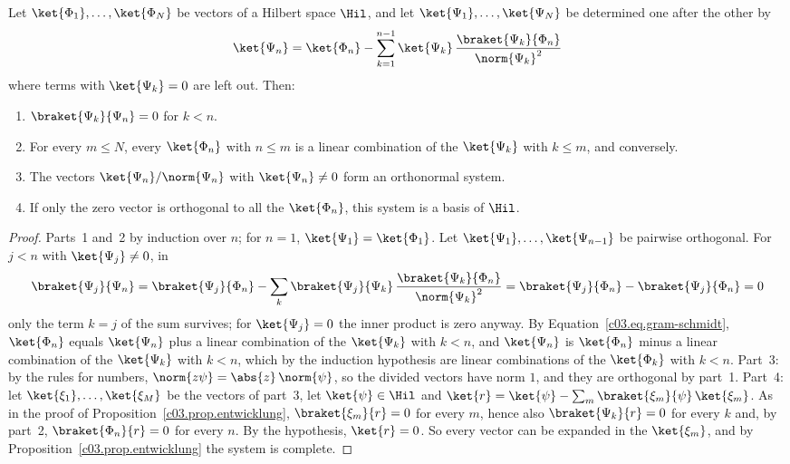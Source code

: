 \begin{proposition}\label{c03.prop.gram-schmidt}
  Let $\ket{\Phi_1}, \dots, \ket{\Phi_N}$ be vectors of a Hilbert space $\Hil$, and let
  $\ket{\Psi_1}, \dots, \ket{\Psi_N}$ be determined one after the other by
  \begin{equation}\label{c03.eq.gram-schmidt}
    \ket{\Psi_n} = \ket{\Phi_n} - \sum_{k=1}^{n-1} \ket{\Psi_k}\, \frac{\braket{\Psi_k}{\Phi_n}}{\norm{\Psi_k}^2}
  \end{equation}
  where terms with $\ket{\Psi_k} = 0$ are left out. Then:
  \begin{enumerate}
    \item $\braket{\Psi_k}{\Psi_n} = 0$ for $k < n$.
    \item For every $m \leq N$, every $\ket{\Phi_n}$ with $n \leq m$ is a linear combination of
      the $\ket{\Psi_k}$ with $k \leq m$, and conversely.
    \item The vectors $\ket{\Psi_n} / \norm{\Psi_n}$ with $\ket{\Psi_n} \neq 0$ form an
      orthonormal system.
    \item If only the zero vector is orthogonal to all the $\ket{\Phi_n}$, this system is a
      basis of $\Hil$.
  \end{enumerate}
\end{proposition}
\begin{proof}
  Parts~1 and~2 by induction over $n$; for $n = 1$, $\ket{\Psi_1} = \ket{\Phi_1}$. Let
  $\ket{\Psi_1}, \dots, \ket{\Psi_{n-1}}$ be pairwise orthogonal. For $j < n$ with
  $\ket{\Psi_j} \neq 0$, in
  \begin{equation}\label{c03.eq.gs-beweis}
    \braket{\Psi_j}{\Psi_n}
    = \braket{\Psi_j}{\Phi_n} - \sum_{k} \braket{\Psi_j}{\Psi_k}\, \frac{\braket{\Psi_k}{\Phi_n}}{\norm{\Psi_k}^2}
    = \braket{\Psi_j}{\Phi_n} - \braket{\Psi_j}{\Phi_n} = 0
  \end{equation}
  only the term $k = j$ of the sum survives; for $\ket{\Psi_j} = 0$ the inner product is zero
  anyway. By Equation~\eqref{c03.eq.gram-schmidt}, $\ket{\Phi_n}$ equals $\ket{\Psi_n}$ plus a
  linear combination of the $\ket{\Psi_k}$ with $k < n$, and $\ket{\Psi_n}$ is $\ket{\Phi_n}$
  minus a linear combination of the $\ket{\Psi_k}$ with $k < n$, which by the induction
  hypothesis are linear combinations of the $\ket{\Phi_k}$ with $k < n$. Part~3: by the rules for
  numbers, $\norm{z\psi} = \abs{z}\, \norm{\psi}$, so the divided vectors have norm $1$, and
  they are orthogonal by part~1. Part~4: let $\ket{\xi_1}, \dots, \ket{\xi_M}$ be the vectors of
  part~3, let $\ket{\psi} \in \Hil$ and
  $\ket{r} = \ket{\psi} - \sum_m \braket{\xi_m}{\psi}\, \ket{\xi_m}$. As in the proof of
  Proposition~\ref{c03.prop.entwicklung}, $\braket{\xi_m}{r} = 0$ for every $m$, hence also
  $\braket{\Psi_k}{r} = 0$ for every $k$ and, by part~2, $\braket{\Phi_n}{r} = 0$ for every
  $n$. By the hypothesis, $\ket{r} = 0$. So every vector can be expanded in the $\ket{\xi_m}$,
  and by Proposition~\ref{c03.prop.entwicklung} the system is complete.
\end{proof}


